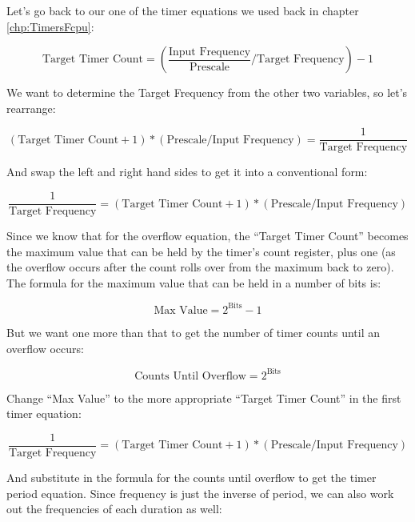 \documentclass[a4paper,oneside]{book}
\begin{document}
Let's go back to our one of the timer equations we used back in chapter \ref{chp:TimersFcpu}: 

\begin{displaymath}
\text{Target Timer Count} = (\frac{\text{Input Frequency}}{\text{Prescale}} / \text{Target Frequency}) - 1  
\end{displaymath}

We want to determine the Target Frequency from the other two variables, so let's rearrange: 

\begin{displaymath}
(\text{Target Timer Count} + 1) * (\text{Prescale} / \text{Input Frequency}) = \frac{1}{\text{Target Frequency}}
\end{displaymath}

And swap the left and right hand sides to get it into a conventional form:

\begin{displaymath}
\frac{1}{\text{Target Frequency}} = (\text{Target Timer Count} + 1) * (\text{Prescale} / \text{Input Frequency})
\end{displaymath}

Since we know that for the overflow equation, the ``Target Timer Count'' becomes the maximum value that can be held by the timer's count register, plus one (as the overflow occurs after the count rolls over from the maximum back to zero). The formula for the maximum value that can be held in a number of bits is: 

\begin{displaymath}
\text{Max Value} = 2^\text{Bits} - 1 
\end{displaymath}

But we want one more than that to get the number of timer counts until an overflow occurs: 

\begin{displaymath}
\text{Counts Until Overflow} = 2^\text{Bits}
\end{displaymath}

Change ``Max Value'' to the more appropriate ``Target Timer Count'' in the first timer equation:

\begin{displaymath}
\frac{1}{\text{Target Frequency}} = (\text{Target Timer Count} + 1) * (\text{Prescale} / \text{Input Frequency})
\end{displaymath}

And substitute in the formula for the counts until overflow to get the timer period equation. Since frequency is just the inverse of period, we can also work out the frequencies of each duration as well: 
\end{document}
